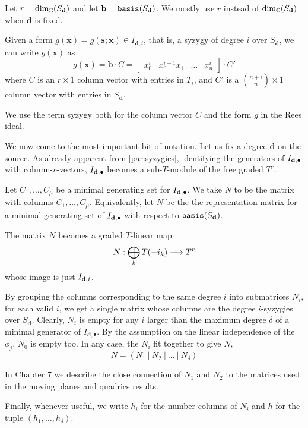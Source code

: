 \documentclass[fleqn,reqno]{amsart}
\begin{document}
\begin{paragraf}
\label{par:syzygies}
Let $r=\dim_{\mathbb{C}}(S_{\mathbf d})$ and
let $\mathbf b=\mathop{\tt basis}(S_{\mathbf d})$.
We mostly use $r$ instead of $\dim_{\mathbb{C}}(S_{\mathbf d})$ when $\mathbf d$ is fixed.

Given a form $g(\mathbf x)=g(\mathbf s;\mathbf x)\in I_{\mathbf d,i}$,
that is, a syzygy of degree $i$ over $S_{\mathbf d}$,
we can write $g(\mathbf x)$ as
\[
g(\mathbf x)=\mathbf b\cdot C=
\begin{bmatrix}
	x_0^i& x_0^{i-1}x_1& \ldots& x_n^i
\end{bmatrix}\cdot C'
\]
where $C$ is an $r\times1$ column vector with entries in $T_i$,
and $C'$ is a $\binom{n+i}{n}\times1$ column vector with entries in $S_{\mathbf d}$.

We use the term syzygy both for the column vector $C$ and the form $g$ in the
Rees ideal.
\end{paragraf}

\begin{paragraf}
\label{par:N-matrix}
We now come to the most important bit of notation.
Let us fix a degree $\mathbf d$ on the source.
As already apparent from \eqref{par:syzygies},
identifying the generators of $I_{\mathbf d,\bullet}$ with column-$r$-vectors,
$I_{\mathbf d,\bullet}$ becomes a sub-$T$-module of the free graded $T^r$.

Let $C_1,\ldots,C_\mu$ be a minimal generating set for $I_{\mathbf d,\bullet}$.
We take $N$ to be the matrix with columns $C_1,\ldots,C_\mu$.
Equivalently, let $N$ be the the representation matrix for a minimal
generating set of $I_{\mathbf d,\bullet}$ with respect to $\mathop{\tt basis}(S_\mathbf d)$.

The matrix $N$ becomes a graded $T$-linear map
\[
N:\bigoplus_{k} T(-i_k)\longrightarrow T^r
\]
whose image is just $I_{\mathbf d,i}$.

By grouping the columns corresponding to the same degree $i$ into submatrices $N_i$,
for each valid $i$, we get a single matrix whose columns are the degree $i$-syzygies over $S_{\mathbf d}$.
Clearly, $N_i$ is empty for any $i$ larger than the maximum degree $\delta$ of a minimal generator
of $I_{\mathbf d,\bullet}$.
By the assumption on the linear independence of the $\phi_j$, $N_0$ is empty too.
In any case, the $N_i$ fit together to give $N$,
\[
	N=(N_1~|~N_2~|~\ldots~|~N_\delta)
\]

In Chapter 7 we describe the close connection of $N_1$ and $N_2$ to the matrices used in
the moving planes and quadrics results.

Finally, whenever useful, we write $h_i$ for the number columns of $N_i$
and $h$ for the tuple $(h_1,\ldots,h_\delta)$.
\end{paragraf}
\end{document}
